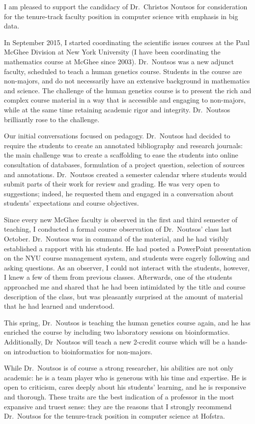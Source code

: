 \documentclass[10pt,stdletter]{newlfm}
\begin{document}
\begin{newlfm}

I am pleased to support the candidacy of Dr.~Christos Noutsos for consideration for the tenure-track faculty position in computer science with emphasis in big data.

In September 2015, I started coordinating the scientific issues courses at the Paul McGhee Division at New York University (I have been coordinating the mathematics course at McGhee since 2003). Dr.~Noutsos was a new adjunct faculty, scheduled to teach a human genetics course.  Students in the course are non-majors, and do not necessarily have an extensive background in mathematics and science. The challenge of the human genetics course is to present the rich and complex course material in a way that is accessible and engaging to non-majors, while at the same time retaining academic rigor and integrity. Dr.~Noutsos brilliantly rose to the challenge.

Our initial conversations focused on pedagogy. Dr.~Noutsos had decided to require the students to create an annotated bibliography and research journals: the main challenge was to create a scaffolding to ease the students into online consultation of databases, formulation of a project question, selection of sources and annotations. Dr.~Noutsos created a semester calendar where students would submit parts of their work for review and grading. He was very open to suggestions; indeed, he requested them and engaged in a conversation about students' expectations and course objectives.

Since every new McGhee faculty is observed in the first and third semester of teaching,  I conducted a formal course observation of Dr.~Noutsos' class last October. Dr.~Noutsos was in command of the material, and he had visibly established a rapport with his students. He had posted a PowerPoint presentation on the NYU course management system, and students were eagerly following and asking questions. As an observer, I could not interact with the students, however, I knew a few of them from previous classes. Afterwards, one of the students approached me and shared that he had been intimidated by the title and course description of the class, but  was pleasantly surprised at the amount of material that he had learned and understood. 

This spring, Dr.~Noutsos is teaching the human genetics course again, and he has enriched the course by including two laboratory sessions on bioinformatics. Additionally, Dr~Noutsos will teach a new 2-credit course which will be a hands-on introduction to bioinformatics for non-majors. 

While Dr.~Noutsos is of course a strong researcher,  his abilities are not only academic: he is a team player who is generous with his time and expertise. He is open to criticism,  cares deeply about his students' learning, and he is responsive and thorough. These traits are the best indication of a professor in the most expansive and truest sense: they are the reasons that I strongly recommend Dr.~Noutsos  for the tenure-track position in computer science at Hofstra.

\end{newlfm}
\end{document}
